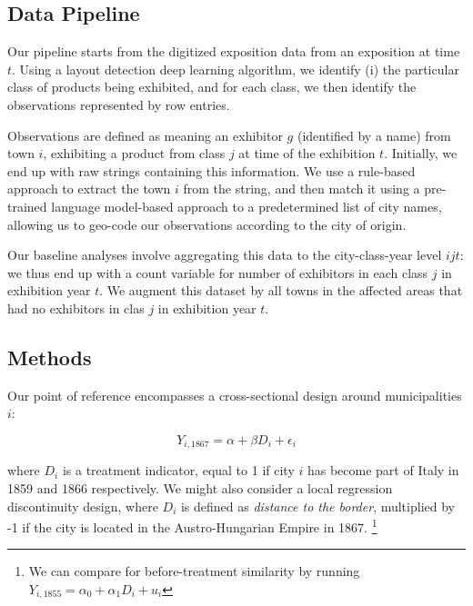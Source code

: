 \subsection{Data Pipeline}



Our pipeline starts from the digitized exposition data from an exposition at time $t$. Using a layout detection deep learning algorithm, we identify (i) the particular class of products being exhibited, and for each class, we then identify the observations represented by row entries. 

Observations are defined as meaning an exhibitor $g$ (identified by a name) from town $i$, exhibiting a product from class $j$ at time of the exhibition $t$. Initially, we end up with raw strings containing this information. We use a rule-based approach to extract the town $i$ from the string, and then match it using a pre-trained language model-based approach to a predetermined list of city names, allowing us to geo-code our observations according to the city of origin. 

Our baseline analyses involve aggregating this data to the city-class-year level $ijt$: we thus end up with a count variable for number of exhibitors in each class $j$ in exhibition year $t$. We augment this dataset by all towns in the affected areas that had no exhibitors in clas $j$ in exhibition year $t$. 


\subsection{Methods}



Our point of reference encompasses a cross-sectional design around municipalities $i$:

\begin{equation*}
    Y_{i, 1867} = \alpha + \beta D_i + \epsilon_i 
\end{equation*}

where $D_i$ is a treatment indicator, equal to 1 if city $i$ has become part of Italy in 1859 and 1866 respectively. We might also consider a local regression discontinuity design, where $D_i$ is defined as \textit{distance to the border}, multiplied by -1 if the city is located in the Austro-Hungarian Empire in 1867. \footnote{We can compare for before-treatment similarity by running $Y_{i, 1855} = \alpha_0 + \alpha_1 D_i + u_i$}

